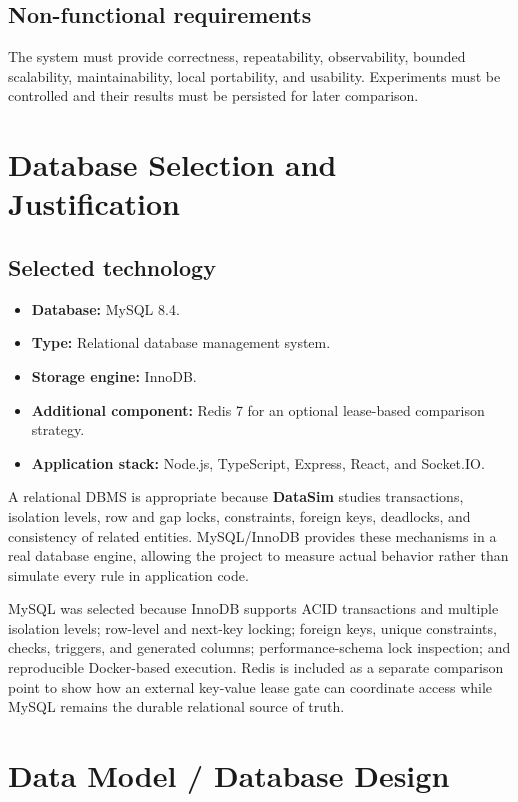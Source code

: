\documentclass[12pt,a4paper]{article}
\newcommand{\datasim}{\textbf{DataSim}}
\begin{document}
\subsection{Non-functional requirements}

The system must provide correctness, repeatability, observability, bounded scalability, maintainability, local portability, and usability. Experiments must be controlled and their results must be persisted for later comparison.

\section{Database Selection and Justification}

\subsection{Selected technology}
\begin{itemize}
\item \textbf{Database:} MySQL 8.4.
\item \textbf{Type:} Relational database management system.
\item \textbf{Storage engine:} InnoDB.
\item \textbf{Additional component:} Redis 7 for an optional lease-based comparison strategy.
\item \textbf{Application stack:} Node.js, TypeScript, Express, React, and Socket.IO.
\end{itemize}

A relational DBMS is appropriate because \datasim{} studies transactions, isolation levels, row and gap locks, constraints, foreign keys, deadlocks, and consistency of related entities. MySQL/InnoDB provides these mechanisms in a real database engine, allowing the project to measure actual behavior rather than simulate every rule in application code.

MySQL was selected because InnoDB supports ACID transactions and multiple isolation levels; row-level and next-key locking; foreign keys, unique constraints, checks, triggers, and generated columns; performance-schema lock inspection; and reproducible Docker-based execution. Redis is included as a separate comparison point to show how an external key-value lease gate can coordinate access while MySQL remains the durable relational source of truth.

\section{Data Model / Database Design}
\end{document}
